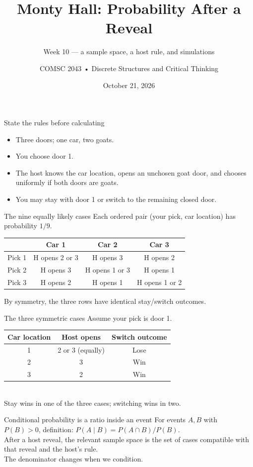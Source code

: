 \documentclass[aspectratio=169,10pt]{beamer}
\title{Monty Hall: Probability After a Reveal}
\subtitle{Week 10 — a sample space, a host rule, and simulations}
\author{COMSC 2043 • Discrete Structures and Critical Thinking}
\date{October 21, 2026}
\begin{document}
\frame{\titlepage}
\begin{frame}{State the rules before calculating}
\begin{itemize}\item Three doors; one car, two goats.\item You choose door 1.\item The host knows the car location, opens an unchosen goat door, and chooses uniformly if both doors are goats.\item You may stay with door 1 or switch to the remaining closed door.\end{itemize}

\par\end{frame}
\begin{frame}{The nine equally likely cases}
Each ordered pair (your pick, car location) has probability $1/9$.\medskip
\centering\begin{tabular}{c|ccc} & Car 1 & Car 2 & Car 3\\\hline Pick 1 & H opens 2 or 3 & H opens 3 & H opens 2\\Pick 2 & H opens 3 & H opens 1 or 3 & H opens 1\\Pick 3 & H opens 2 & H opens 1 & H opens 1 or 2\end{tabular}
\medskip\raggedright By symmetry, the three rows have identical stay/switch outcomes.\end{frame}
\begin{frame}{The three symmetric cases}
Assume your pick is door 1.\\[2mm]\begin{tabular}{c|c|c}Car location&Host opens&Switch outcome\\\hline1&2 or 3 (equally)&Lose\\2&3&Win\\3&2&Win\end{tabular}\\[3mm]Stay wins in one of the three cases; switching wins in two.\end{frame}
\begin{frame}{Conditional probability is a ratio inside an event}
For events $A,B$ with $P(B)>0$, definition: $P(A\mid B)=P(A\cap B)/P(B)$.\\[3mm]After a host reveal, the relevant sample space is the set of cases compatible with that reveal and the host's rule.\\[2mm]The denominator changes when we condition.\end{frame}
\end{document}
